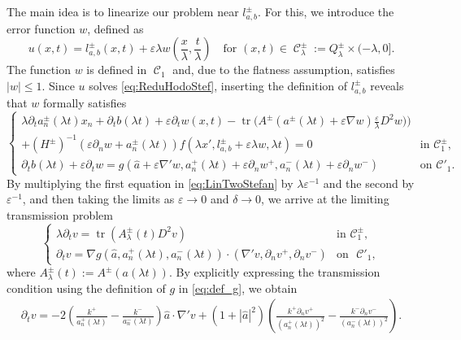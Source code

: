 \documentclass[12pt]{article}
\numberwithin{Theorem}{section}
\theoremstyle{definition}
\theoremstyle{remark}
\numberwithin{equation}{section}
\DeclareMathOperator{\C}{\mathcal{C}}
\DeclareMathOperator*{\tr}{tr}
\newcommand{\p}{\partial}
\begin{document}
The main idea is to linearize our problem near $l_{a,b}^{\pm}$.  For this, we introduce the error function $w$, defined as
\[
u(x,t)= l_{a,b}^{\pm}(x,t) + \varepsilon \lambda w\left( \frac{x}{\lambda},\frac{t}{\lambda}\right) \quad \text{for }(x,t) \in \C_{\lambda}^{\pm}:= Q_\lambda^{\pm} \times (-\lambda,0].
\]
The function $w$ is defined in $\C_1$ and, due to the flatness assumption, satisfies $|w| \leq 1$.
Since $u$ solves \eqref{eq:ReduHodoStef}, inserting the definition of $l_{a,b}^{\pm}$ reveals that $w$ formally satisfies
\begin{equation}\label{eq:LinTwoStefan}
        \begin{cases}
        \lambda {\p_t} a_n^{\pm} (\lambda t) x_n + {\p_t} b(\lambda t) + \varepsilon \partial_t w(x,t) - \tr\big(A^{\pm}(a^{\pm}(\lambda t) + \varepsilon \nabla w) \frac{\varepsilon}{ \lambda} D^2 w )\big) \\  +(H^{\pm})^{-1}\left( \varepsilon\partial_{n}w+ a_n^{\pm}(\lambda t) \right) f(\lambda x', l_{a,b}^{\pm} + \varepsilon\lambda w, \lambda t) =0  & \text{in } \mathcal{C}_1^\pm,\\
        {\p_t} b(\lambda t) +  \varepsilon \partial_{t} w =  g(\hat a + \varepsilon \nabla' w, a_n^{+}(\lambda t) + \varepsilon \p_n w^+,a_n^{-}(\lambda t) + \varepsilon \p_n w^-)& \text{on } \mathcal{C}'_1.
    \end{cases}
    \end{equation}
    By multiplying the first equation in \eqref{eq:LinTwoStefan} by $\lambda \varepsilon^{-1}$ and the second by $\varepsilon^{-1}$, and then taking the limits as $\varepsilon \to 0$ and $\delta \to 0$, we arrive at the limiting transmission problem
\begin{equation}\label{eq:LimitTwoStefan}
        \begin{cases}
        \lambda \partial_t v = \tr(A_{\lambda}^{\pm}(t) D^2 v )& \text{in} \,\, \mathcal{C}_1^{\pm},\\
     \partial_t v = \nabla g (\hat a, a_n^+(\lambda t),a_n^-(\lambda t)) \cdot (\nabla' v, \p_n v^+, \p_n v^{-}) & \text{on} \,\,  \,\, \mathcal{C}'_1,
    \end{cases}
    \end{equation}
    where  $A_{\lambda}^{\pm}(t):= A^{\pm}(a(\lambda t))$.
By explicitly expressing the transmission condition using the definition of $g$ in \eqref{eq:def_g}, we obtain
\begin{align*}
\p_t v= -2 \left( \frac{k^+}{a_n^+(\lambda t)}- \frac{k^-}{a_n^-(\lambda t)}\right) \hat a\cdot \nabla'v + \left(1+|\hat a|^2 \right) \left( \frac{k^+ \p_n v^+}{(a_n^+(\lambda t))^2} -\frac{k^- \p_n v^-}{(a_n^-(\lambda t))^2}\right).
\end{align*}
\end{document}
